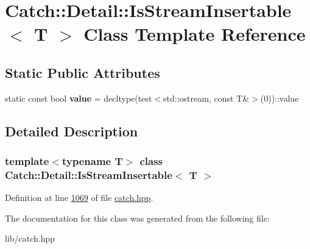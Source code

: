 \hypertarget{classCatch_1_1Detail_1_1IsStreamInsertable}{}\section{Catch\+::Detail\+::Is\+Stream\+Insertable$<$ T $>$ Class Template Reference}
\label{classCatch_1_1Detail_1_1IsStreamInsertable}
\subsection*{Static Public Attributes}
\begin{DoxyCompactItemize}
\item 
\mbox{\label{classCatch_1_1Detail_1_1IsStreamInsertable_a42818b09ae5851126a70ee263769e309}} 
static const bool {\bfseries value} = decltype(test$<$std\+::ostream, const T\&$>$(0))\+::value
\end{DoxyCompactItemize}


\subsection{Detailed Description}
\subsubsection*{template$<$typename T$>$\newline
class Catch\+::\+Detail\+::\+Is\+Stream\+Insertable$<$ T $>$}



Definition at line \mbox{\hyperlink{catch_8hpp_source_l01069}{1069}} of file \mbox{\hyperlink{catch_8hpp_source}{catch.\+hpp}}.



The documentation for this class was generated from the following file\+:\begin{DoxyCompactItemize}
\item 
lib/catch.\+hpp\end{DoxyCompactItemize}
